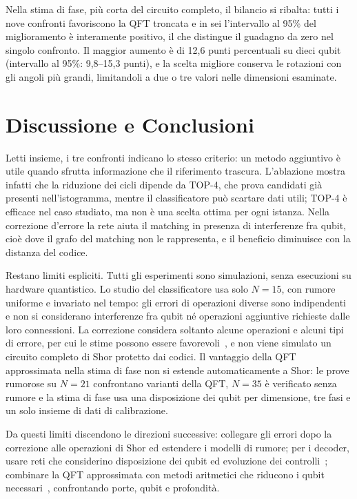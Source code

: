 Nella stima di fase, più corta del circuito completo, il bilancio si ribalta:
tutti i nove confronti favoriscono la QFT troncata e in sei l'intervallo al 95\%
del miglioramento è interamente positivo, il che distingue il guadagno da zero
nel singolo confronto.
Il maggior aumento è di 12,6 punti percentuali su dieci qubit (intervallo al
95\%: 9,8--15,3 punti), e la scelta migliore conserva le rotazioni con gli angoli
più grandi, limitandoli a due o tre valori nelle dimensioni esaminate.

\section*{Discussione e Conclusioni}

Letti insieme, i tre confronti indicano lo stesso criterio: un metodo aggiuntivo
è utile quando sfrutta informazione che il riferimento trascura.
L'ablazione mostra infatti che la riduzione dei cicli dipende da TOP-4, che prova
candidati già presenti nell'istogramma, mentre il classificatore può scartare
dati utili; TOP-4 è efficace nel caso studiato, ma non è una scelta ottima per
ogni istanza.
Nella correzione d'errore la rete aiuta il matching in presenza di interferenze
fra qubit, cioè dove il grafo del matching non le rappresenta, e il beneficio
diminuisce con la distanza del codice.

Restano limiti espliciti.
Tutti gli esperimenti sono simulazioni, senza esecuzioni su hardware quantistico.
Lo studio del classificatore usa solo $N=15$, con rumore uniforme e invariato nel
tempo: gli errori di operazioni diverse sono indipendenti e non si considerano
interferenze fra qubit né operazioni aggiuntive richieste dalle loro connessioni.
La correzione considera soltanto alcune operazioni e alcuni tipi di errore, per
cui le stime possono essere favorevoli~\cite{plaquette2026}, e non viene simulato
un circuito completo di Shor protetto dai codici.
Il vantaggio della QFT approssimata nella stima di fase non si estende
automaticamente a Shor: le prove rumorose su $N=21$ confrontano varianti della
QFT, $N=35$ è verificato senza rumore e la stima di fase usa una disposizione dei
qubit per dimensione, tre fasi e un solo insieme di dati di calibrazione.

Da questi limiti discendono le direzioni successive: collegare gli errori dopo la
correzione alle operazioni di Shor ed estendere i modelli di rumore; per i
decoder, usare reti che considerino disposizione dei qubit ed evoluzione dei
controlli~\cite{alphaqubit2024}; combinare la QFT approssimata con metodi
aritmetici che riducono i qubit necessari~\cite{chevignard2025}, confrontando
porte, qubit e profondità.

\par
\endgroup

\let\addcontentsline\abstractACL
\renewcommand{\theequation}{\thechapter.\arabic{equation}}
\renewcommand{\thetable}{\thechapter.\arabic{table}}
\setcounter{equation}{0}
\setcounter{table}{0}
\clearpage

